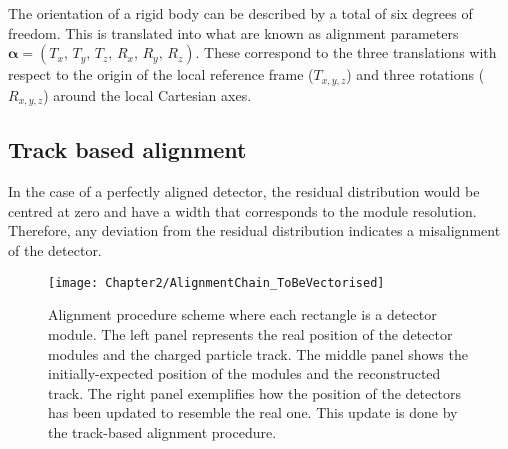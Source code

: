 The orientation of a rigid body can be described by a total of six degrees of freedom. 
This is translated into what are known as alignment parameters 
$\bm{\alpha} = (T_{x},\, T_{y},\, T_{z},\, R_{x},\, R_{y},\,R_{z})$. These correspond to the
three translations with respect to the origin of the local reference frame ($T_{x,y,z}$) 
and three rotations ($R_{x,y,z}$) around the local Cartesian axes. 




\subsection{Track based alignment}
In the case of a perfectly aligned detector, the residual distribution would be centred at 
zero and have a width that corresponds to the
module resolution. Therefore, any deviation from the residual distribution indicates a 
misalignment of the detector. 


\begin{figure}
\centering
\texttt{[image: Chapter2/AlignmentChain\_ToBeVectorised]}
\caption{Alignment procedure scheme where each rectangle is a detector module. 
	The left panel represents the real position of the detector modules and the charged particle track.
	The middle panel shows the initially-expected position of the modules and the reconstructed track.
	The right panel exemplifies how the position of the detectors has been updated to resemble the real one.
	This update is done by the track-based alignment procedure.    
	}
	
\label{fig:Chap2:Alignment:Chain}
\end{figure}

